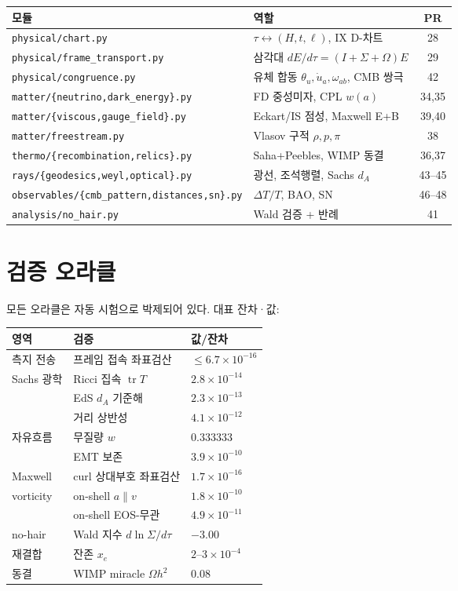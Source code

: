 \documentclass[11pt]{article}
\newcommand{\Sig}{\Sigma}
\begin{document}
\begin{center}
\begin{tabular}{@{}llc@{}}
\toprule
모듈 & 역할 & PR \\
\midrule
\texttt{physical/chart.py} & $\tau\!\leftrightarrow\!(H,t,\ell)$, IX D-차트 & 28 \\
\texttt{physical/frame\_transport.py} & 삼각대 $dE/d\tau=(I{+}\Sig{+}\Omega)E$ & 29 \\
\texttt{physical/congruence.py} & 유체 합동 $\theta_u,\dot u_a,\omega_{ab}$, CMB 쌍극 & 42 \\
\texttt{matter/\{neutrino,dark\_energy\}.py} & FD 중성미자, CPL $w(a)$ & 34,35 \\
\texttt{matter/\{viscous,gauge\_field\}.py} & Eckart/IS 점성, Maxwell E+B & 39,40 \\
\texttt{matter/freestream.py} & Vlasov 구적 $\rho,p,\pi$ & 38 \\
\texttt{thermo/\{recombination,relics\}.py} & Saha+Peebles, WIMP 동결 & 36,37 \\
\texttt{rays/\{geodesics,weyl,optical\}.py} & 광선, 조석행렬, Sachs $d_A$ & 43--45 \\
\texttt{observables/\{cmb\_pattern,distances,sn\}.py} & $\Delta T/T$, BAO, SN & 46--48 \\
\texttt{analysis/no\_hair.py} & Wald 검증 + 반례 & 41 \\
\bottomrule
\end{tabular}
\end{center}

\section{검증 오라클}

모든 오라클은 자동 시험으로 박제되어 있다. 대표 잔차·값:

\begin{center}
\begin{tabular}{@{}lll@{}}
\toprule
영역 & 검증 & 값/잔차 \\
\midrule
측지 전송 & 프레임 접속 좌표검산 & $\le6.7\times10^{-16}$ \\
Sachs 광학 & Ricci 집속 $\operatorname{tr}T$ & $2.8\times10^{-14}$ \\
& EdS $d_A$ 기준해 & $2.3\times10^{-13}$ \\
& 거리 상반성 & $4.1\times10^{-12}$ \\
자유흐름 & 무질량 $w$ & $0.333333$ \\
& EMT 보존 & $3.9\times10^{-10}$ \\
Maxwell & curl 상대부호 좌표검산 & $1.7\times10^{-16}$ \\
vorticity & on-shell $a\parallel v$ & $1.8\times10^{-10}$ \\
& on-shell EOS-무관 & $4.9\times10^{-11}$ \\
no-hair & Wald 지수 $d\ln\Sig/d\tau$ & $-3.00$ \\
재결합 & 잔존 $x_e$ & $2$--$3\times10^{-4}$ \\
동결 & WIMP miracle $\Omega h^2$ & $0.08$ \\
\bottomrule
\end{tabular}
\end{center}
\end{document}
